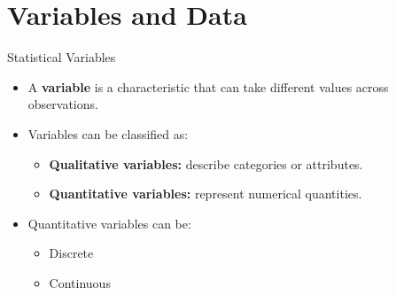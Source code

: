 \documentclass{beamer}
\begin{document}

\section{Variables and Data}

\begin{frame}{Statistical Variables}

\begin{itemize}

  \item A \textbf{variable} is a characteristic that can take different values across observations.

  \vskip 0.4cm

  \item Variables can be classified as:

  \begin{itemize}

    \item \textbf{Qualitative variables:} describe categories or attributes.

    \item \textbf{Quantitative variables:} represent numerical quantities.

  \end{itemize}

  \vskip 0.4cm

  \item Quantitative variables can be:

  \begin{itemize}
    \item Discrete
    \item Continuous
  \end{itemize}

\end{itemize}

\end{frame}
\end{document}
